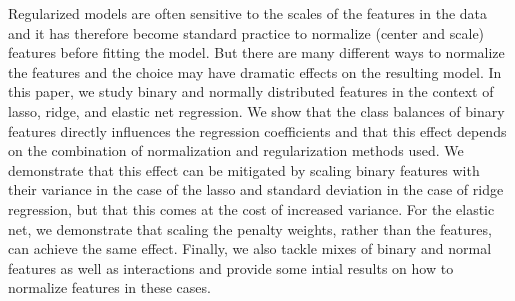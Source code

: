 Regularized models are often sensitive to the scales of the features in the data and it has
therefore become standard practice to normalize (center and scale) features before fitting
the model. But there are many different ways to normalize the features and the choice may
have dramatic effects on the resulting model. In this paper, we study binary and normally
distributed features in the context of lasso, ridge, and elastic net regression. We show
that the class balances of binary features directly influences the regression coefficients
and that this effect depends on the combination of normalization and regularization methods
used. We demonstrate that this effect can be mitigated by scaling binary features with
their variance in the case of the lasso and standard deviation in the case of ridge
regression, but that this comes at the cost of increased variance. For the elastic net, we
demonstrate that scaling the penalty weights, rather than the features, can achieve the
same effect. Finally, we also tackle mixes of binary and normal features as well as
interactions and provide some intial results on how to normalize features in these cases.
